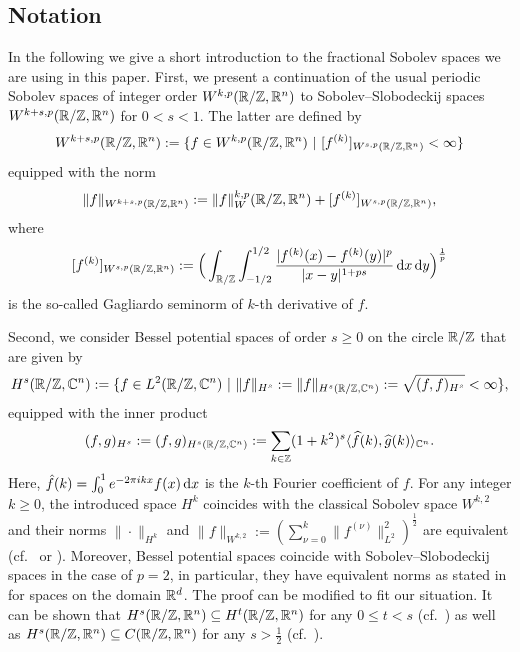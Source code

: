 \subsection*{Notation}\label{subsec:Notation}
In the following we give a short introduction to the fractional Sobolev spaces we are using in this paper. First, we present a continuation of the usual periodic Sobolev spaces of integer order $W^{k,p}(\mathbb{R}/\mathbb{Z}, \mathbb{R}^n)$ to Sobolev–Slobodeckij spaces $W^{k+s,p}(\mathbb{R}/\mathbb{Z}, \mathbb{R}^n)$ for $0<s <1$. The latter are defined by
\[
	W^{k+s,p}(\mathbb{R}/\mathbb{Z}, \mathbb{R}^n) := \{ f\in W^{k,p}(\mathbb{R}/\mathbb{Z}, \mathbb{R}^n) \ | \ [f^{(k)}]_{W^{s,p}(\mathbb{R}/\mathbb{Z}, \mathbb{R}^n)} < \infty \}
\]
equipped with the norm 
\[
	\|f\|_{W^{k+s,p}(\mathbb{R}/\mathbb{Z}, \mathbb{R}^n)} := \|f\|_W^{k,p}(\mathbb{R}/\mathbb{Z}, \mathbb{R}^n) + [f^{(k)}]_{W^{s,p}(\mathbb{R}/\mathbb{Z}, \mathbb{R}^n)},
\]
where 
\[
	[f^{(k)}]_{W^{s,p}(\mathbb{R}/\mathbb{Z}, \mathbb{R}^n)} := \Big(\int_{\mathbb{R}/\mathbb{Z}} \int_{-1/2}^{1/2} \frac{|f^{(k)}(x) - f^{(k)}(y)|^p}{|x-y|^{1+ps}} \,\mathrm{d} x \,\mathrm{d} y \Big)^{\frac 1p}
\]
is the so-called Gagliardo seminorm of $k$-th derivative of $f$. 

Second, we consider Bessel potential spaces of order $s \geq 0$ on the circle $\mathbb{R}/\mathbb{Z}$ that are given by 
\begin{align*}
H^s(\mathbb{R}/\mathbb{Z}, \mathbb{C}^n) := \{f\in L^2 (\mathbb{R}/\mathbb{Z}, \mathbb{C}^n) \ | \ \| f \|_{H^s}:= \| f \|_{H^s(\mathbb{R}/\mathbb{Z},\mathbb{C}^n)} := \sqrt{(f,f)_{H^s}} < \infty  \},
\end{align*}
equipped with the inner product  
\begin{align*}
(f,g)_{H^s} := (f,g)_{H^s(\mathbb{R}/\mathbb{Z},\mathbb{C}^n)} := \sum_{k\in\mathbb{Z}} (1+k^2)^s \langle \widehat{f}(k), \widehat{g}(k) \rangle_{\mathbb{C}^n}.
\end{align*}
Here, $\hat f(k) = \int_0^1 e^{-2 \pi i k x} f(x) \,\mathrm{d} x$ is the $k$-th Fourier coefficient of $f$.
For any integer $k\geq 0$, the introduced space $H^k$ coincides with the classical Sobolev space $W^{k,2}$  and their norms $\|\cdot\|_{H^k}$ and $\|f\|_{W^{k,2}}:= (\sum_{\nu=0}^{k} \|f^{(\nu)}\|^2_{L^2})^{\frac{1}{2}}$ are equivalent (cf.~\cite[Lem.~1.2]{Reiter:2012:RepulsiveKnotEnergies} or \cite[7.62]{AdamsFournier:2003:SobolevSpaces}).
Moreover, Bessel potential spaces coincide with Sobolev–Slobodeckij spaces in the case of $p=2$, in particular, they have equivalent norms
as stated in \cite[Proposition~3.4]{DiNezzaetal:2012:HitchhikersGuide} for spaces on the domain $\mathbb{R}^d$. The proof can be modified to fit our situation.
It can be shown that $H^s(\mathbb{R}/\mathbb{Z},\mathbb{R}^n)\subseteq H^t(\mathbb{R}/ \mathbb{Z},\mathbb{R}^n)$ for any $0 \leq t<s$ (cf.~\cite[Chapter~4,~Proposition~3.4]{Taylor:1996:PartialDifferentialEquationsa}) as well as $H^s(\mathbb{R}/\mathbb{Z},\mathbb{R}^n) \subseteq C(\mathbb{R}/\mathbb{Z},\mathbb{R}^n)$ for any $s> \frac{1}{2}$ (cf.~\cite[Chapter~4,~Proposition 3.3]{Taylor:1996:PartialDifferentialEquationsa}).


